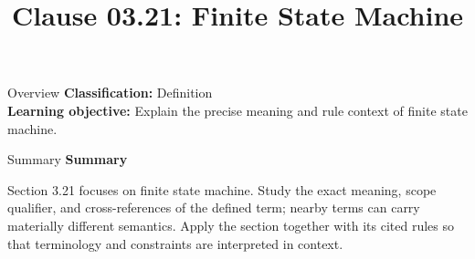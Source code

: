 \documentclass[10pt,letterpaper]{article}
\title{Clause 03.21: Finite State Machine}
\author{}
\date{}
\begin{document}
\maketitle
\begin{CornellOverviewBox}{Overview}
\textbf{Classification:} Definition\\[2pt]
\textbf{Learning objective:} Explain the precise meaning and rule context of finite state machine.
\end{CornellOverviewBox}\begin{CornellSummaryBox}{Summary}
{\sffamily\bfseries\color{Accent} Summary}\par\vspace{3pt}Section 3.21 focuses on finite state machine. Study the exact meaning, scope qualifier, and cross-references of the defined term; nearby terms can carry materially different semantics. Apply the section together with its cited rules so that terminology and constraints are interpreted in context.
\end{CornellSummaryBox}
\end{document}
